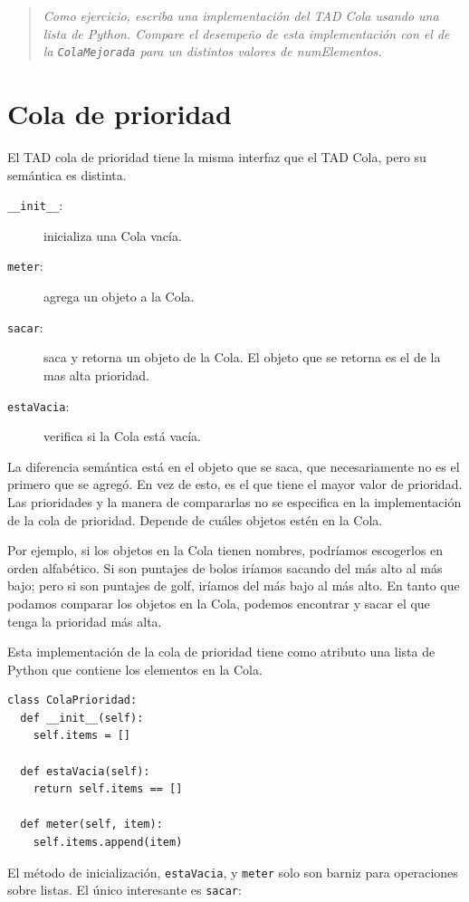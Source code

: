 \begin{quote}
{\em Como ejercicio, escriba una implementación del TAD Cola usando
una lista de Python.  Compare el desempeño de esta implementación con el
de la \texttt{ColaMejorada} para un distintos valores de numElementos.}
\end{quote}


\section{Cola de prioridad}

El TAD cola de prioridad tiene la misma interfaz que el TAD Cola, pero
su semántica es distinta. 

\begin{description}

\item[\texttt{\_\_init\_\_}:] inicializa una Cola vacía.

\item[\texttt{meter}:] agrega un objeto a la Cola.

\item[\texttt{sacar}:] saca y retorna un objeto de la Cola.  El objeto
que se retorna es el de la mas alta prioridad.

\item[\texttt{estaVacia}:] verifica si la Cola está vacía.

\end{description}

La diferencia semántica está en el objeto que se saca, que necesariamente
no es el primero que se agregó. En vez de esto, es el que tiene el 
mayor valor de prioridad. Las prioridades y la manera de compararlas no
se especifica en la implementación de la cola de prioridad. Depende de
cuáles objetos estén en la Cola.

Por ejemplo, si los objetos en la Cola tienen nombres, podríamos escogerlos
en orden alfabético. Si son puntajes de bolos iríamos sacando del
más alto al más bajo; pero si son puntajes de golf, iríamos del más bajo
al más alto. En tanto que podamos comparar los objetos en la Cola,
podemos encontrar y sacar el que tenga la prioridad más alta.

Esta implementación de la cola de prioridad tiene como atributo una
lista de Python que contiene los elementos en la Cola.

\beforeverb
\begin{verbatim}
class ColaPrioridad:
  def __init__(self):
    self.items = []

  def estaVacia(self):
    return self.items == []

  def meter(self, item):
    self.items.append(item)
\end{verbatim}
\afterverb
%
El método de inicialización, \texttt{estaVacia}, y \texttt{meter} solo son
barniz para operaciones sobre listas. El único interesante es {\tt sacar}:

